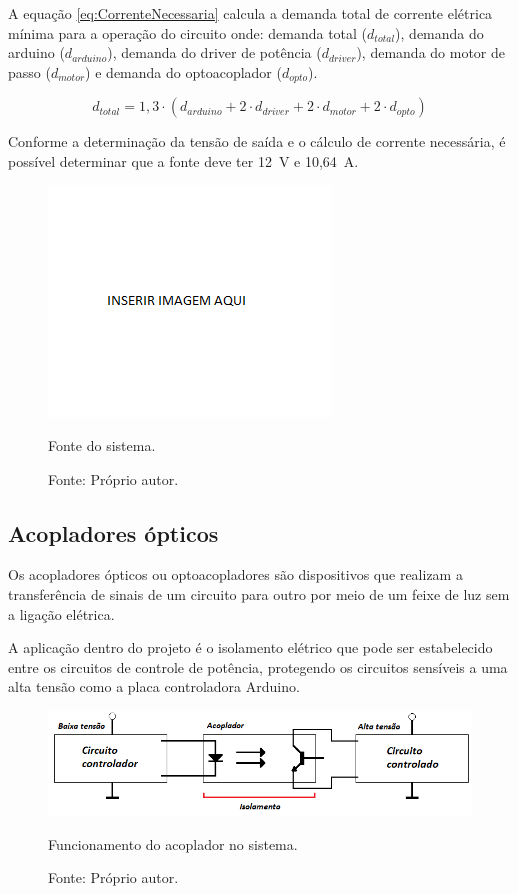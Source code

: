 A equação \ref{eq:CorrenteNecessaria} calcula a demanda total de 
corrente elétrica mínima para a operação do circuito onde:
demanda total ($d_{total}$), demanda do arduino ($d_{arduino}$), demanda do driver de potência ($d_{driver}$),
demanda do motor de passo ($d_{motor}$) e demanda do optoacoplador ($d_{opto}$).

\begin{equation}\label{eq:CorrenteNecessaria}
    d_{total} = 1,3 \cdot (d_{arduino} + 2 \cdot d_{driver} + 2 \cdot d_{motor} + 2 \cdot d_{opto})    
\end{equation}

Conforme a determinação da tensão de saída e o cálculo de corrente necessária, 
é possível determinar que a fonte deve ter 12~V e 10,64~A.

\begin{figure}[!htb]
\centering
\includegraphics[scale = 0.2]{figuras/fonte}
\caption{Fonte do sistema.}
\caption*{Fonte: Próprio autor.}
\label{fig:fonte}
\end{figure}
    
\subsection{Acopladores ópticos}\label{subsec:metacoplador}

Os acopladores ópticos ou optoacopladores são dispositivos que realizam a transferência de 
sinais de um circuito para outro por meio de um feixe de luz sem a ligação elétrica.

A aplicação dentro do projeto é o isolamento elétrico que pode ser estabelecido entre 
os circuitos de controle de potência, protegendo os circuitos sensíveis a uma alta tensão 
como a placa controladora Arduino.

\begin{figure}[!htb]
\centering
\includegraphics[scale = 0.7]{figuras/acoplador}
\caption{Funcionamento do acoplador no sistema.}
\caption*{Fonte: Próprio autor.}
\label{fig:acoplador}
\end{figure}
    
